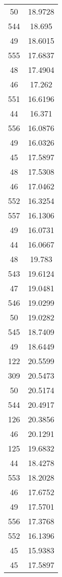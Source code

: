 \begin{tabular}[c]{|c|c|}
        50&   18.9728\\
       544&    18.695\\
        49&   18.6015\\
       555&   17.6837\\
        48&   17.4904\\
        46&    17.262\\
       551&   16.6196\\
        44&    16.371\\
       556&   16.0876\\
        49&   16.0326\\
        45&   17.5897\\
        48&   17.5308\\
        46&   17.0462\\
       552&   16.3254\\
       557&   16.1306\\
        49&   16.0731\\
        44&   16.0667\\
        48&    19.783\\
       543&   19.6124\\
        47&   19.0481\\
       546&   19.0299\\
        50&   19.0282\\
       545&   18.7409\\
        49&   18.6449\\
       122&   20.5599\\
       309&   20.5473\\
        50&   20.5174\\
       544&   20.4917\\
       126&   20.3856\\
        46&   20.1291\\
       125&   19.6832\\
        44&   18.4278\\
       553&   18.2028\\
        46&   17.6752\\
        49&   17.5701\\
       556&   17.3768\\
       552&   16.1396\\
        45&   15.9383\\
        45&   17.5897\\

\end{tabular}
